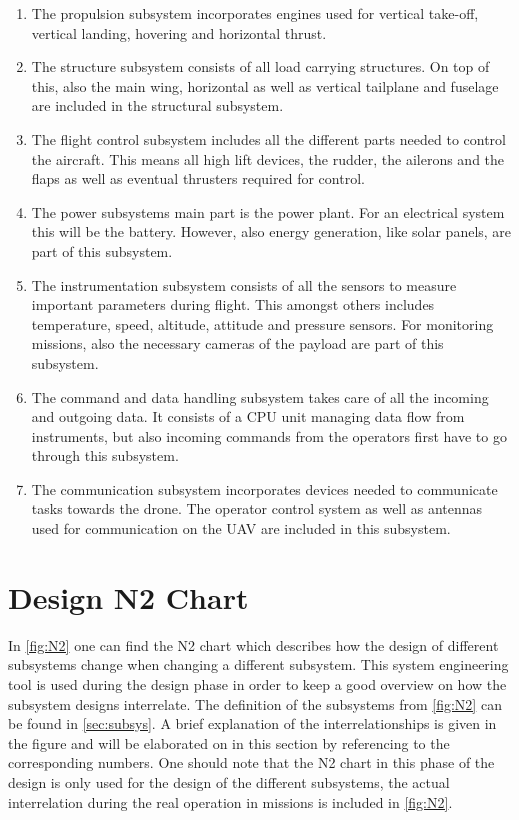 \begin{enumerate}
 \item The propulsion subsystem incorporates engines used for vertical take-off, vertical landing, hovering and horizontal thrust.

\item The structure subsystem consists of all load carrying structures. On top of this, also the main wing, horizontal as well as vertical tailplane and fuselage are included in the structural subsystem. 
\item The flight control subsystem includes all the different parts needed to control the aircraft. This means all high lift devices, the rudder, the ailerons and the flaps as well as eventual thrusters required for control. 

\item The power subsystems main part is the power plant. For an electrical system this will be the battery. However, also energy generation, like solar panels, are part of this subsystem. 

\item The instrumentation subsystem consists of all the sensors to measure important parameters during flight. This amongst others includes temperature, speed, altitude, attitude and pressure sensors. For monitoring missions, also the necessary cameras of the payload are part of this subsystem. 

\item The command and data handling subsystem takes care of all the incoming and outgoing data. It consists of a CPU unit managing data flow from instruments, but also incoming commands from the operators first have to go through this subsystem. 

\item The communication subsystem incorporates devices needed to communicate tasks towards the drone. The operator control system as well as antennas used for communication on the UAV are included in this subsystem. 
\end{enumerate}

\section{Design N2 Chart}
\label{sec:n2design}
In \autoref{fig:N2} one can find the N2 chart which describes how the design of different subsystems change when changing a different subsystem. This system engineering tool is used during the design phase in order to keep a good overview on how the subsystem designs interrelate. The definition of the subsystems from \autoref{fig:N2} can be found in \autoref{sec:subsys}. A brief explanation of the interrelationships is given in the figure and will be elaborated on in this section by referencing to the corresponding numbers. One should note that the N2 chart in this phase of the design is only used for the design of the different subsystems, the actual interrelation during the real operation in missions is included in \autoref{fig:N2}. 

